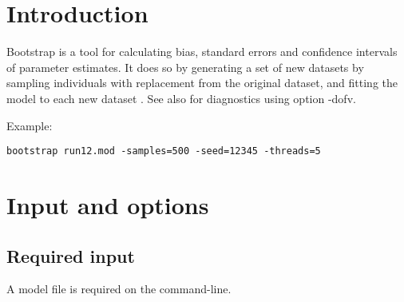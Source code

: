 



\maketitle
\newcommand{\guidetoolname}{bootstrap}


\section{Introduction}

Bootstrap is a tool for calculating bias, standard errors and confidence intervals of parameter estimates. It does so by generating a set of new datasets by sampling individuals with replacement from the original dataset, and fitting the model to each new dataset \cite{Efron}. 
See also \cite{Niebecker} for diagnostics using option -dofv.

Example:
\begin{verbatim}
bootstrap run12.mod -samples=500 -seed=12345 -threads=5
\end{verbatim}

\section{Input and options}

\subsection{Required input}
A model file is required on the command-line.

